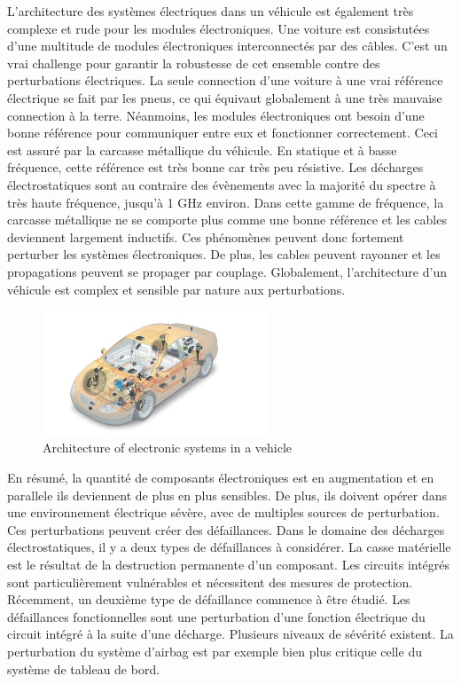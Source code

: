L'architecture des systèmes électriques dans un véhicule est également très complexe et rude pour les modules électroniques.
Une voiture est consistutées d'une multitude de modules électroniques interconnectés par des câbles.
C'est un vrai challenge pour garantir la robustesse de cet ensemble contre des perturbations électriques.
La seule connection d'une voiture à une vrai référence électrique se fait par les pneus, ce qui équivaut globalement à une très mauvaise connection à la terre.
Néanmoins, les modules électroniques ont besoin d'une bonne référence pour communiquer entre eux et fonctionner correctement.
Ceci est assuré par la carcasse métallique du véhicule.
En statique et à basse fréquence, cette référence est très bonne car très peu résistive.
Les décharges électrostatiques sont au contraire des évènements avec la majorité du spectre à très haute fréquence, jusqu'à 1 GHz environ.
Dans cette gamme de fréquence, la carcasse métallique ne se comporte plus comme une bonne référence et les cables deviennent largement inductifs.
Ces phénomènes peuvent donc fortement perturber les systèmes électroniques.
De plus, les cables peuvent rayonner et les propagations peuvent se propager par couplage.
Globalement, l'architecture d'un véhicule est complex et sensible par nature aux perturbations.

\begin{figure}[!h]
  \centering
  \includegraphics[width=0.6\textwidth]{src/1/figures/systemintegration_01_uv-data.jpg}
  \caption{Architecture of electronic systems in a vehicle \cite{car-architecture}}
  \label{fig:car-architecture}
\end{figure}

En résumé, la quantité de composants électroniques est en augmentation et en parallele ils deviennent de plus en plus sensibles.
De plus, ils doivent opérer dans une environnement électrique sévère, avec de multiples sources de perturbation.
Ces perturbations peuvent créer des défaillances.
Dans le domaine des décharges électrostatiques, il y a deux types de défaillances à considérer.
La casse matérielle est le résultat de la destruction permanente d'un composant.
Les circuits intégrés sont particulièrement vulnérables \cite{impactESDsemiconductors} et nécessitent des mesures de protection.
Récemment, un deuxième type de défaillance commence à être étudié.
Les défaillances fonctionnelles sont une perturbation d'une fonction électrique du circuit intégré à la suite d'une décharge.
Plusieurs niveaux de sévérité existent.
La perturbation du système d'airbag est par exemple bien plus critique celle du système de tableau de bord.

